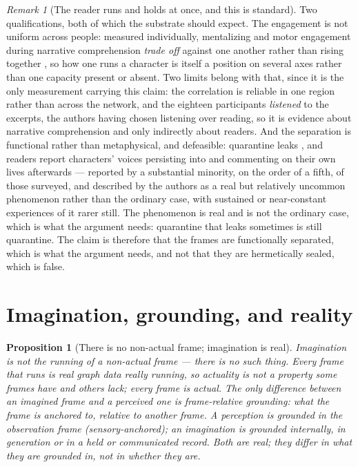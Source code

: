 \documentclass[11pt,a4paper]{article}
\newtheorem{proposition}[definition]{Proposition}
\theoremstyle{remark}\newtheorem{remark}[definition]{Remark}
\begin{document}
\begin{remark}[The reader runs and holds at once, and this is standard]
Two qualifications, both of which the substrate should expect. The engagement is not uniform
across people: measured individually, mentalizing and motor engagement during narrative
comprehension \emph{trade off} against one another rather than rising together
\citep{nijhof2015}, so how one runs a character is itself a position on several axes rather
than one capacity present or absent. Two limits belong with that, since it is the only measurement
carrying this claim: the correlation is reliable in one region rather than across the network, and the
eighteen participants \emph{listened} to the excerpts, the authors having chosen listening over
reading, so it is evidence about narrative comprehension and only indirectly about readers. And the
separation is functional rather than metaphysical, and defeasible: quarantine leaks
\citep{gendler2006}, and readers report characters' voices persisting into and commenting on their own
lives afterwards \citep{aldersonday2017} --- reported by a substantial minority, on the order of a
fifth, of those surveyed, and described by the authors as a real but relatively uncommon
phenomenon rather than the ordinary case, with sustained or near-constant experiences of it rarer
still. The phenomenon is real and is not the ordinary case,
which is what the argument needs: quarantine that leaks sometimes is still quarantine. The claim is
therefore that the frames are functionally separated, which is what the argument needs, and not
that they are hermetically sealed, which is false.
\end{remark}

\section{Imagination, grounding, and reality}\label{sec:grounding}
\begin{proposition}[There is no non-actual frame; imagination is real]\label{prop:imagination-real}
Imagination is not the running of a non-actual frame --- there is no such thing. Every
frame that runs is real graph data really running, so actuality is not a property some
frames have and others lack; every frame is actual. The only difference between an
imagined frame and a perceived one is frame-relative grounding: what the frame is
anchored to, relative to another frame. A perception is grounded in the observation
frame (sensory-anchored); an imagination is grounded internally, in generation or in a
held or communicated record. Both are real; they differ in what they are grounded in,
not in whether they are.
\end{proposition}
\end{document}
